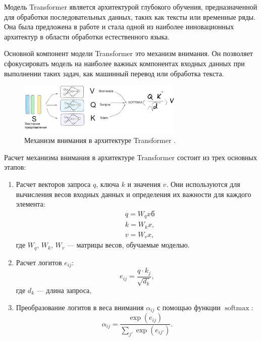 Модель Transformer является архитектурой глубокого обучения, предназначенной для обработки последовательных данных,
таких как тексты или временные ряды. 
Она была предложена в работе \cite{vaswani2017attention} и стала одной из наиболее инновационных архитектур
в области обработки естественного языка.

Основной компонент модели Transformer это механизм внимания. Он позволяет сфокусировать модель
на наиболее важных компонентах входных данных при выполнении таких задач, как машинный перевод или обработка текста.

\begin{figure}[h]
    \centering
    \includegraphics[width=0.7\textwidth]{assets/ml/nn/transformer.excalidraw.png}
    \caption{Механизм внимания в архитектуре Transformer \cite{vaswani2017attention}. }
    \label{attention}
\end{figure}

Расчет механизма внимания в архитектуре Transformer состоит из трех основных этапов:\begin{enumerate}
    \item  Расчет векторов запроса $q$, ключа $k$ и значения $v$.
    Они используются для вычисления весов входных данных и определения их важности для каждого элемента:
    \begin{equation}
        \begin{aligned}
            &q =W_q xб \\ 
            &k = W_k x, \\
            &v = W_v x,
        \end{aligned}
    \end{equation}
    где \(W_q\), \(W_k\), \(W_v\) --- матрицы весов, обучаемые моделью.
    \item Расчет логитов \(e_{ij}\):
    \begin{equation}
        e_{ij} = \frac{q \cdot k_j}{\sqrt{d_k}},
    \end{equation}
    где \(d_k\) --- длина запроса,
    \item Преобразование логитов в веса внимания \( \alpha_{ij} \) с помощью функции $\operatorname{softmax}$:
    \begin{equation}
        \alpha_{ij} = \frac{\exp(e_{ij})}{\sum_{j'} \exp(e_{ij'})}.
    \end{equation}
\end{enumerate}
